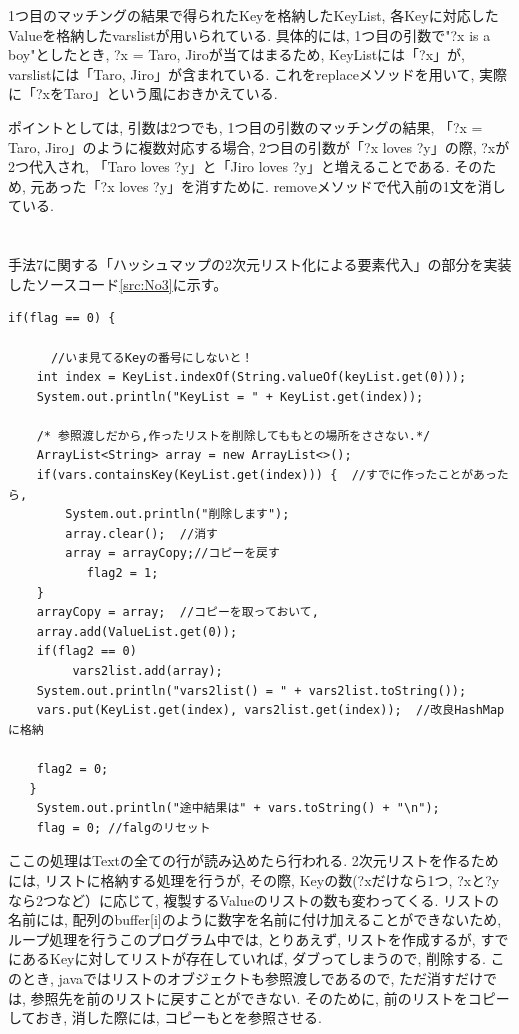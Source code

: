 \documentclass[12pt]{jarticle}
\begin{document}
1つ目のマッチングの結果で得られたKeyを格納したKeyList, 各Keyに対応したValueを格納したvarslistが用いられている. 具体的には, 1つ目の引数で"?x is a boy"としたとき, ?x = Taro, Jiroが当てはまるため, KeyListには「?x」が, varslistには「Taro, Jiro」が含まれている. これをreplaceメソッドを用いて, 実際に「?xをTaro」という風におきかえている.

ポイントとしては, 引数は2つでも, 1つ目の引数のマッチングの結果, 「?x = Taro, Jiro」のように複数対応する場合, 2つ目の引数が「?x loves ?y」の際, ?xが2つ代入され, 「Taro loves ?y」と「Jiro loves ?y」と増えることである. そのため, 元あった「?x loves ?y」を消すために. removeメソッドで代入前の1文を消している.\\\\\\


手法7に関する「ハッシュマップの2次元リスト化による要素代入」の部分を実装したソースコード\ref{src:No3}に示す。
\begin{lstlisting}[caption=ハッシュマップの2次元リスト化,label=src:No3]
   if(flag == 0) {

      //いま見てるKeyの番号にしないと！
	int index = KeyList.indexOf(String.valueOf(keyList.get(0)));
	System.out.println("KeyList = " + KeyList.get(index));
	
	/* 参照渡しだから,作ったリストを削除してももとの場所をささない.*/
	ArrayList<String> array = new ArrayList<>();
	if(vars.containsKey(KeyList.get(index))) {	//すでに作ったことがあったら,
	    System.out.println("削除します");
	    array.clear();	//消す
	    array = arrayCopy;//コピーを戻す
		   flag2 = 1;
	}
	arrayCopy = array;	//コピーを取っておいて,
	array.add(ValueList.get(0));
	if(flag2 == 0)
	     vars2list.add(array);
	System.out.println("vars2list() = " + vars2list.toString());
	vars.put(KeyList.get(index), vars2list.get(index));  //改良HashMapに格納

	flag2 = 0;
   }
    System.out.println("途中結果は" + vars.toString() + "\n");
    flag = 0; //falgのリセット
\end{lstlisting}

ここの処理はTextの全ての行が読み込めたら行われる. 2次元リストを作るためには, リストに格納する処理を行うが, その際, Keyの数(?xだけなら1つ, ?xと?yなら2つなど）に応じて, 複製するValueのリストの数も変わってくる. リストの名前には, 配列のbuffer[i]のように数字を名前に付け加えることができないため, ループ処理を行うこのプログラム中では, とりあえず, リストを作成するが, すでにあるKeyに対してリストが存在していれば, ダブってしまうので, 削除する. このとき, javaではリストのオブジェクトも参照渡しであるので, ただ消すだけでは, 参照先を前のリストに戻すことができない. そのために, 前のリストをコピーしておき, 消した際には, コピーもとを参照させる.\\\\\\
\end{document}
